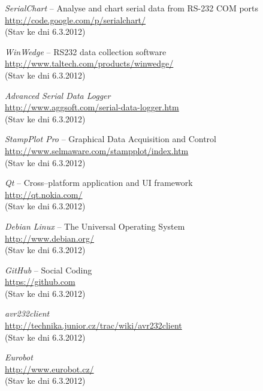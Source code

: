 \documentclass[12pt, a4paper, oneside]{article}
\newcommand{\It}{\textit}  %
\begin{document}
 \begin{thebibliography}{99}

     \It{SerialChart} -- Analyse and chart serial data from RS-232 COM ports \\
    \url{http://code.google.com/p/serialchart/}\\
    (Stav ke dni 6.3.2012)

     \It{WinWedge} -- RS232 data collection software \\
    \url{http://www.taltech.com/products/winwedge/}\\
    (Stav ke dni 6.3.2012)

     \It{Advanced Serial Data Logger} \\
    \url{http://www.aggsoft.com/serial-data-logger.htm}\\
    (Stav ke dni 6.3.2012)

     \It{StampPlot Pro} -- Graphical Data Acquisition and Control \\
    \url{http://www.selmaware.com/stampplot/index.htm}\\
    (Stav ke dni 6.3.2012)

     \It{Qt} -- Cross--platform application and UI framework \\
    \url{http://qt.nokia.com/}\\
    (Stav ke dni 6.3.2012)

     \It{Debian Linux} -- The Universal Operating System \\
    \url{http://www.debian.org/}\\
    (Stav ke dni 6.3.2012)

     \It{GitHub} -- Social Coding \\
    \url{https://github.com}\\
    (Stav ke dni 6.3.2012)

     \It{avr232client} \\
    \url{http://technika.junior.cz/trac/wiki/avr232client}\\
    (Stav ke dni 6.3.2012)

     \It{Eurobot} \\
    \url{http://www.eurobot.cz/}\\
    (Stav ke dni 6.3.2012)


\end{thebibliography}
\end{document}
